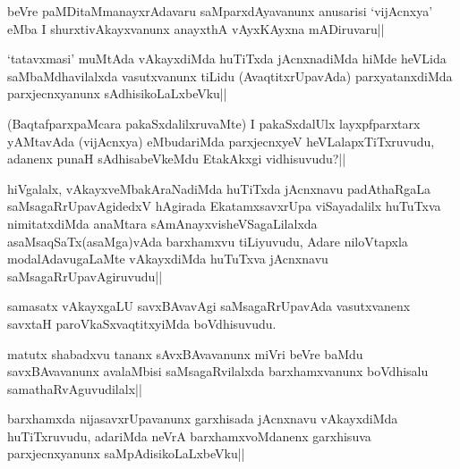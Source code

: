 
\begin{artha}
beVre paMDitaMmanayxrAdavaru saMparxdAyavanunx anusarisi `vijAcnxya' eMba I shurxtivAkayxvanunx anayxthA vAyxKAyxna mADiruvaru||
\end{artha}


\begin{artha}
`tatavxmasi' muMtAda vAkayxdiMda huTiTxda jAcnxnadiMda hiMde heVLida saMbaMdhavilalxda vasutxvanunx tiLidu (AvaqtitxrUpavAda) parxyatanxdiMda parxjecnxyanunx sAdhisikoLaLxbeVku||
\end{artha}


\begin{artha}
(BaqtafparxpaMcara pakaSxdalilxruvaMte) I pakaSxdalUlx layxpfparxtarx yAMtavAda (vijAcnxya) eMbudariMda parxjecnxyeV heVLalapxTiTxruvudu, adanenx punaH sAdhisabeVkeMdu EtakAkxgi vidhisuvudu?||
\end{artha}

\begin{artha}
hiVgalalx, vAkayxveMbakAraNadiMda huTiTxda jAcnxnavu padAthaRgaLa saMsagaRrUpavAgidedxV hAgirada EkatamxsavxrUpa viSayadalilx huTuTxva nimitatxdiMda anaMtara sAmAnayxvisheVSagaLilalxda asaMsaqSaTx(asaMga)vAda barxhamxvu tiLiyuvudu, Adare niloVtapxla modalAdavugaLaMte vAkayxdiMda huTuTxva jAcnxnavu saMsagaRrUpavAgiruvudu||
\end{artha}


\begin{artha}
samasatx vAkayxgaLU savxBAvavAgi saMsagaRrUpavAda vasutxvanenx savxtaH paroVkaSxvaqtitxyiMda boVdhisuvudu.
\end{artha}

\begin{artha}
matutx shabadxvu tananx sAvxBAvavanunx miVri beVre baMdu savxBAvavanunx avalaMbisi saMsagaRvilalxda barxhamxvanunx boVdhisalu samathaRvAguvudilalx||
\end{artha}

\begin{artha}
barxhamxda nijasavxrUpavanunx garxhisada jAcnxnavu vAkayxdiMda huTiTxruvudu, adariMda neVrA barxhamxvoMdanenx garxhisuva parxjecnxyanunx saMpAdisikoLaLxbeVku||
\end{artha}

